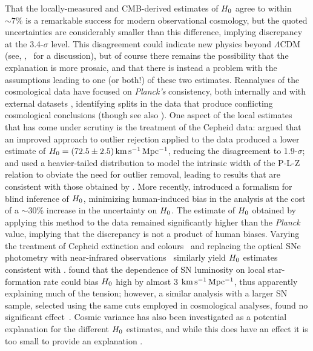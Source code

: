 \documentclass[a4paper,fleqn,usenatbib]{mnras}
\newcommand{\riess}{\citetalias{Riess_etal:2016}}
\newcommand{\kmsmpc}{\ensuremath{{\rm km\,s^{-1}\,Mpc^{-1}}}}
\begin{document}
{That the locally-measured and CMB-derived estimates of $H_0$
agree to within $\sim 7\%$ is a remarkable success
for modern observational cosmology, but the quoted uncertainties 
are considerably smaller than this difference, implying 
discrepancy at the 3.4-$\sigma$ level. 
This disagreement could indicate 
new physics beyond $\Lambda$CDM
(see, \eg,~\citealt{Planck_XIII:2016} for a discussion),
but of course there remains the possibility that the explanation
is more prosaic, and that there is instead a problem with 
the assumptions leading to one (or both!) of these two estimates. 
Reanalyses of the cosmological data have focused on {\it Planck's} 
consistency, both internally and with external datasets 
\citep{Spergel_etal:2015,Addison_etal:2016}, identifying splits 
in the data that produce conflicting cosmological conclusions 
(though see also \citealt{Planck_Int_LI:2016}).
One aspect of the local estimates that has come under scrutiny
is the treatment of the Cepheid data: 
\cite{Efstathiou:2014} argued that an improved approach to 
outlier rejection applied to the \cite{Riess_etal:2011}
data produced a lower estimate of $\hubble = (72.5 \pm 2.5) \, \kmsmpc$,
reducing the disagreement to 1.9-$\sigma$;
and
\cite{Cardona_etal:2016} used a heavier-tailed distribution to model
the intrinsic width of the P-L-Z relation to obviate the need for outlier
removal, leading to results that are consistent with those obtained by \riess.
More recently, \citet{Zhang_etal:2017}
introduced a formalism for blind inference of $H_0$, 
minimizing human-induced bias in the analysis at the cost of a $\sim$30\% 
increase in the uncertainty on $H_0$.
The estimate of $H_0$ obtained by applying
this method to the \cite{Riess_etal:2011} data 
remained significantly higher than the {\em Planck} value,
implying that the discrepancy is not a product of human biases.
Varying the treatment of Cepheid extinction and 
colours~\citep{Follin_Knox:2017} and replacing the optical SNe 
photometry with near-infrared observations~\citep{Dhawan_etal:2017} 
similarly yield $H_0$ estimates consistent with \riess. 
\citet{Rigault_etal:2015} found that the dependence of 
SN luminosity on local star-formation rate could bias $H_0$
high by almost 3 \kmsmpc, thus apparently explaining much
of the tension; 
however, a similar
analysis with a larger SN sample, selected using the same cuts 
employed in cosmological analyses, found no significant 
effect~\citep{Jones_etal:2015}.
Cosmic variance has also been investigated as a potential 
explanation for the different $H_0$ estimates, and 
while this does have an effect it is too small to provide an
explanation \citep{Wu_Huterer:2017}.

}
\end{document}
